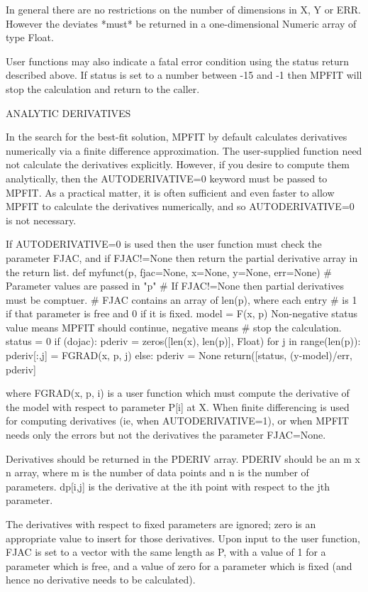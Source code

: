 \begin{DoxyVerb}
 In general there are no restrictions on the number of dimensions in
 X, Y or ERR.  However the deviates *must* be returned in a
 one-dimensional Numeric array of type Float.

 User functions may also indicate a fatal error condition using the
 status return described above. If status is set to a number between
 -15 and -1 then MPFIT will stop the calculation and return to the caller.


                ANALYTIC DERIVATIVES

 In the search for the best-fit solution, MPFIT by default
 calculates derivatives numerically via a finite difference
 approximation.  The user-supplied function need not calculate the
 derivatives explicitly.  However, if you desire to compute them
 analytically, then the AUTODERIVATIVE=0 keyword must be passed to MPFIT.
 As a practical matter, it is often sufficient and even faster to allow
 MPFIT to calculate the derivatives numerically, and so
 AUTODERIVATIVE=0 is not necessary.

 If AUTODERIVATIVE=0 is used then the user function must check the parameter
 FJAC, and if FJAC!=None then return the partial derivative array in the
 return list.
   def myfunct(p, fjac=None, x=None, y=None, err=None)
    # Parameter values are passed in "p"
    # If FJAC!=None then partial derivatives must be comptuer.
    # FJAC contains an array of len(p), where each entry
    # is 1 if that parameter is free and 0 if it is fixed.
    model = F(x, p)
    Non-negative status value means MPFIT should continue, negative means
    # stop the calculation.
    status = 0
    if (dojac):
       pderiv = zeros([len(x), len(p)], Float)
       for j in range(len(p)):
         pderiv[:,j] = FGRAD(x, p, j)
    else:
       pderiv = None
    return([status, (y-model)/err, pderiv]

 where FGRAD(x, p, i) is a user function which must compute the
 derivative of the model with respect to parameter P[i] at X.  When
 finite differencing is used for computing derivatives (ie, when
 AUTODERIVATIVE=1), or when MPFIT needs only the errors but not the
 derivatives the parameter FJAC=None.

 Derivatives should be returned in the PDERIV array. PDERIV should be an m x
 n array, where m is the number of data points and n is the number
 of parameters.  dp[i,j] is the derivative at the ith point with
 respect to the jth parameter.

 The derivatives with respect to fixed parameters are ignored; zero
 is an appropriate value to insert for those derivatives.  Upon
 input to the user function, FJAC is set to a vector with the same
 length as P, with a value of 1 for a parameter which is free, and a
 value of zero for a parameter which is fixed (and hence no
 derivative needs to be calculated).


\end{DoxyVerb}

